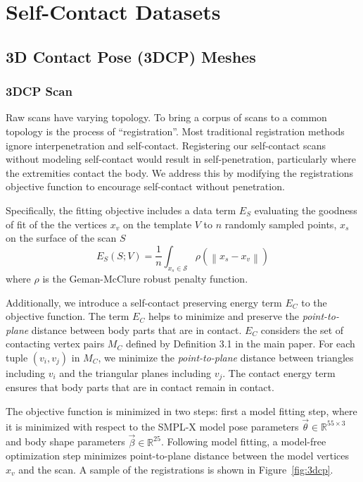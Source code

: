 \documentclass[final]{cvpr}
\theoremstyle{definition}
\begin{document}
\section{Self-Contact Datasets}
\label{sec-registration}
\subsection{3D Contact Pose (3DCP) Meshes}
\subsubsection{3DCP Scan} \label{subsec-3dcpscan}
Raw scans have varying topology.  To bring a corpus of scans to a common topology is the process of ``registration''.
Most traditional registration methods ignore interpenetration and self-contact.
Registering our self-contact scans without modeling self-contact would result in self-penetration, particularly where the extremities contact the body.
We address this by modifying the registrations objective function to encourage self-contact without penetration.

Specifically, the fitting objective includes a data term $E_S$ evaluating the goodness of fit of the the vertices $x_v$ on the template  $V$ to  $n$ randomly sampled points, $x_s$ on the surface of the scan $S$ 
\begin{equation}
\label{eq:co_registrations}
E_S( S;V) = \frac{1}{n} \int_{x_s \in \mathcal{S}} \rho \left( \left\lVert  x_s - x_v  \right\lVert \right)
\end{equation}
where $\rho$ is the  Geman-McClure robust penalty function. 

Additionally, we introduce a  self-contact preserving energy term $E_C$ to the objective function. The term $E_C$ helps  to minimize and preserve the \emph{point-to-plane} distance between body parts that are in contact. $E_C$ considers the set of contacting vertex pairs $M_C$ defined by Definition 3.1 
in the main paper. For each tuple $(v_i,v_j)$ in $M_C$, we minimize the \emph{point-to-plane} distance between triangles including $v_{i}$ and the triangular planes including  $v_{j}$.  The contact energy term ensures that body parts that are in contact remain in contact. 

The objective function is minimized in two steps: first a model fitting step, where it is minimized with respect to the SMPL-X model pose parameters $\vec{\theta} \in \mathbb{R}^{55\times3}$  and body shape parameters $\vec{\beta}\in\mathbb{R}^{25}$. Following model fitting, a model-free optimization step minimizes  point-to-plane distance between the model vertices $x_v$ and the scan. 
A sample of the  registrations is shown in Figure~\ref{fig:3dcp}.
\end{document}

